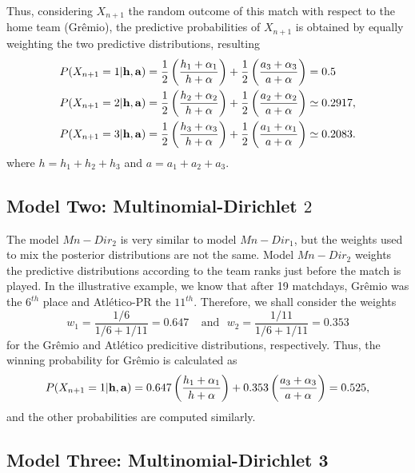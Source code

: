 \documentclass[journal,article,accept,moreauthors,pdftex,12pt,a4paper]{mdpi}
\begin{document}
	Thus, considering $X_{n + 1}$ the random outcome of this match with
	respect to the home team (Gr\^{e}mio), the predictive probabilities
	of $X_{n + 1}$ is obtained by equally weighting the two predictive
	distributions, resulting
	\begin{align*}
	P(X_{n+1}=1|{\bf h}, {\bf a}) &=
	\frac{1}{2}\left(\frac{h_1+\alpha_1}{h+\alpha}\right)+\frac{1}{2}\left(\frac{a_3+\alpha_3}{a+\alpha}\right)=0.5
	\\
	P(X_{n+1}=2|{\bf h}, {\bf a}) &=
	\frac{1}{2}\left(\frac{h_2+\alpha_2}{h+\alpha}\right)+\frac{1}{2}\left(\frac{a_2+\alpha_2}{a+\alpha}\right)\simeq0.2917, \\
	P(X_{n+1}=3|{\bf h}, {\bf a}) &= \frac{1}{2}
	\left(\frac{h_3+\alpha_3}{h+\alpha}\right)+\frac{1}{2}\left(\frac{a_1+\alpha_1}{a+\alpha}\right)\simeq0.2083.
	\end{align*}
	\noindent where $h=h_1+h_2+h_3$ and $a=a_1+a_2+a_3$.
	
	\subsection{Model Two: Multinomial-Dirichlet $2$}
	\label{sec::Mn_Dir2}
	
	The model $Mn-Dir_2$ is very similar to model $Mn-Dir_1$, but the
	weights used to mix the posterior distributions are not the same.
	Model $Mn-Dir_2$ weights the predictive distributions according to
	the team ranks just before the match is played. In the illustrative
	example, we know that after 19 matchdays, Gr\^emio was the $6^{th}$
	place and Atl\'etico-PR the $11^{th}$. Therefore, we shall consider
	the weights
	\[w_1 = \frac{1/6}{1/6+1/11}=0.647 ~ ~ ~ ~ ~\text{and} ~ ~ ~ w_2 = \frac{1/11}{1/6+1/11}=0.353\]
	\noindent for the Gr\^emio and Atl\'etico predicitive distributions,
	respectively. Thus, the winning probability for Gr\^emio is
	calculated as
	\[P(X_{n+1}= 1|{\bf h}, {\bf a})=0.647\left(\frac{h_1+\alpha_1}{h+\alpha}\right)+0.353\left(\frac{a_3+\alpha_3}{a+\alpha}\right)=0.525,\]
	\noindent and the other probabilities are computed similarly.
	
	\subsection{Model Three: Multinomial-Dirichlet 3}
	\label{sec::Mn_Dir3}
	
\end{document}
